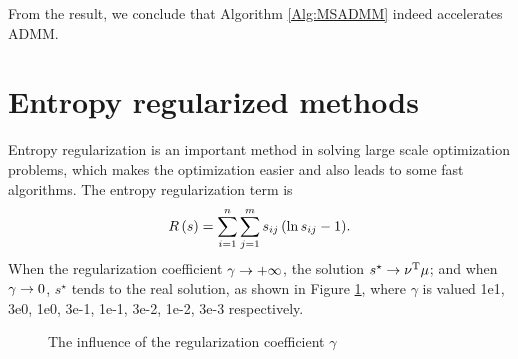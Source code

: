 \documentclass[english]{pkupaper}
\begin{document}
From the result, we conclude that Algorithm \ref{Alg:MSADMM} indeed accelerates ADMM.

\section{Entropy regularized methods}

Entropy regularization \parencite{Benamou2015} is an important method in solving large scale optimization problems, which makes the optimization easier and also leads to some fast algorithms. The entropy regularization term is
\begin{equation}
R \left( s \right) = \sum_{ {i} = {1} }^{n}{\sum_{ {j} = {1} }^{m}{ s_{ i j } \left(  \ln s_{ i j } - 1  \right) }}.
\end{equation}
When the regularization coefficient $ \gamma \rightarrow +\infty $, the solution $ s^{\star} \rightarrow \nu^{\mathrm{T}} \mu $; and when $ \gamma \rightarrow 0 $, $s^{\star}$ tends to the real solution, as shown in Figure \ref{Fig:Gamma}, where $\gamma$ is valued 1e1, 3e0, 1e0, 3e-1, 1e-1, 3e-2, 1e-2, 3e-3 respectively.

\begin{figure}
\centering
\scalebox{0.25}{} 
\hspace{-0.8cm}
\scalebox{0.25}{}
\hspace{-0.8cm} 
\scalebox{0.25}{} 
\hspace{-0.8cm}
\scalebox{0.25}{} 
\scalebox{0.25}{} 
\hspace{-0.8cm}
\scalebox{0.25}{}
\hspace{-0.8cm}
\scalebox{0.25}{}
\hspace{-0.8cm} 
\scalebox{0.25}{}
\caption{The influence of the regularization coefficient $\gamma$} \label{Fig:Gamma}
\end{figure}
\end{document}
